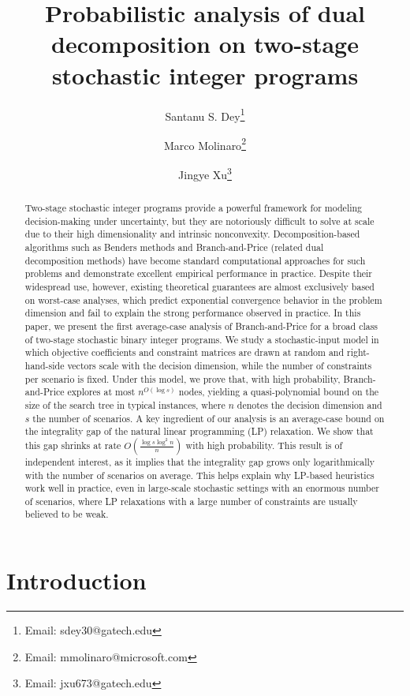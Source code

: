 \documentclass{article}
\title{Probabilistic analysis of dual decomposition on two-stage stochastic integer programs}
\author[1]{Santanu S. Dey\thanks{Email: sdey30@gatech.edu}}
\author[2,3]{Marco Molinaro\thanks{Email: mmolinaro@microsoft.com}}
\author[1]{Jingye Xu\thanks{Email: jxu673@gatech.edu}}
\affil[1]{Georgia Institute of Technology, Atlanta, GA, USA}
\affil[2]{Microsoft Research, Redmond, WA, USA}
\affil[3]{PUC-Rio, Rio de Janeiro, Brazil}
\begin{document}
\maketitle

\begin{abstract}
Two-stage stochastic integer programs provide a powerful framework for modeling
decision-making under uncertainty, but they are notoriously difficult to solve at
scale due to their high dimensionality and intrinsic nonconvexity.
Decomposition-based algorithms such as Benders methods and Branch-and-Price (related dual
decomposition methods) have become standard computational approaches for such
problems and demonstrate excellent empirical performance in practice.
Despite their widespread use, however, existing theoretical guarantees are almost
exclusively based on worst-case analyses, which predict exponential convergence
behavior in the problem dimension and fail to explain the strong performance
observed in practice. In this paper, we present the first average-case analysis of Branch-and-Price
for a broad class of two-stage stochastic binary integer programs.
We study a stochastic-input model in which objective coefficients and constraint
matrices are drawn at random and right-hand-side vectors scale with the decision
dimension, while the number of constraints per scenario is fixed.
Under this model, we prove that, with high probability, Branch-and-Price explores
at most \( n^{O(\log s)} \) nodes, yielding a quasi-polynomial bound on the size of
the search tree in typical instances, where \( n \) denotes the decision dimension
and \( s \) the number of scenarios. A key ingredient of our analysis is an average-case bound on the integrality gap of
the natural linear programming (LP) relaxation. We show that this gap shrinks at rate
\( O\!\left(\frac{\log s \log^2 n}{n}\right) \) with high probability. This result is of
independent interest, as it implies that the integrality gap grows only logarithmically
with the number of scenarios on average. This helps explain why LP-based
heuristics work well in practice, even in large-scale stochastic settings with an enormous number of
scenarios, where LP relaxations with a large number of constraints are usually believed to be weak.
\end{abstract}



\section{Introduction}
\end{document}
